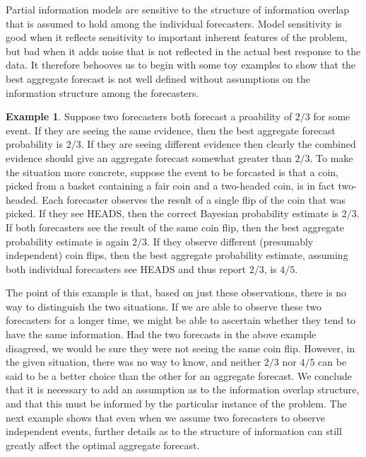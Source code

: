 \documentclass[11pt]{article}
\theoremstyle{definition}
\newtheorem{example}[theorem]{Example}
\theoremstyle{definition}
\begin{document}
Partial information models are sensitive to the structure of 
information overlap that is assumed to hold among the individual 
forecasters.  Model sensitivity is good when it reflects
sensitivity to important inherent features of the problem,
but bad when it adds noise that is not reflected in the
actual best response to the data.  It therefore behooves
us to begin with some toy examples to show that the best
aggregate forecast is not well defined without assumptions
on the information structure among the forecasters.

\begin{example}
Suppose two forecasters both forecast a proability of $2/3$ for
some event.  If they are seeing the same evidence, then the best
aggregate forecast probability is $2/3$.  If they are seeing
different evidence then clearly the combined evidence should give
an aggregate forecast somewhat greater than $2/3$.  To make the
situation more concrete, suppose the event to be forcasted is that
a coin, picked from a basket containing a fair coin and a two-headed
coin, is in fact two-headed.  Each forecaster observes the result
of a single flip of the coin that was picked.  If they see HEADS,
then the correct Bayesian probability estimate is $2/3$.  If both
forecasters see the result of the same coin flip, then the best
aggregate probability estimate is again $2/3$.  If they observe
different (presumably independent) coin flips, then the best
aggregate probability estimate, assuming both individual forecasters
see HEADS and thus report $2/3$, is $4/5$.  
\end{example}

The point of this example is that, based on just these observations, 
there is no way to distinguish the two situations.  If we are able
to observe these two forecasters for a longer time, we might be
able to ascertain whether they tend to have the same information.
Had the two forecasts in the above example disagreed, we would be
sure they were not seeing the same coin flip.  However, in the given
situation, there was no way to know, and neither $2/3$ nor $4/5$ 
can be said to be a better choice than the other for an aggregate
forecast.  We conclude that it is necessary to add an assumption
as to the information overlap structure, and that this must be
informed by the particular instance of the problem. The next example shows that even when we assume two forecasters to observe
independent events, further details as to the structure of information
can still greatly affect the optimal aggregate forecast.  
\end{document}
